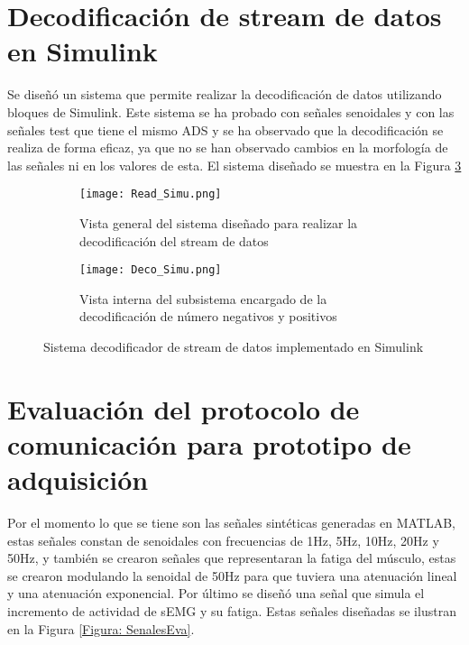 
\section{Decodificación de stream de datos en Simulink}
Se diseñó un sistema que permite realizar la decodificación de datos utilizando bloques de Simulink. Este sistema se ha probado con señales senoidales y con las señales test que tiene el mismo ADS y se ha observado que la decodificación se realiza de forma eficaz, ya que no se han observado cambios en la morfología de las señales ni en los valores de esta. El sistema diseñado se muestra en la Figura \ref{Figura: Decodi}

\begin{figure}[htbp]
	\centering
	\begin{subfigure}[htbp]{0.7\textwidth}
		\texttt{[image: Read\_Simu.png]}
		\caption{Vista general del sistema diseñado para realizar la decodificación del stream de datos}
		\label{Figura: readSimu}
	\end{subfigure}
	\begin{subfigure}[htbp]{0.7\textwidth}
		\texttt{[image: Deco\_Simu.png]}
		\caption{Vista interna del subsistema encargado de la decodificación de número negativos y positivos}
		\label{Figura: decoSimu}
	\end{subfigure}
	\caption{Sistema decodificador de stream de datos implementado en Simulink}
	\label{Figura: Decodi}
\end{figure}

\section{Evaluación del protocolo de comunicación para prototipo de adquisición}
Por el momento lo que se tiene son las señales sintéticas generadas en MATLAB, estas señales constan de senoidales con frecuencias de 1Hz, 5Hz, 10Hz, 20Hz y 50Hz, y también se crearon señales que representaran la fatiga del músculo, estas se crearon modulando la senoidal de 50Hz para que tuviera una atenuación lineal y una atenuación exponencial. Por último se diseñó una señal que simula el incremento de actividad de sEMG y su fatiga. Estas señales diseñadas se ilustran en la Figura \ref{Figura: SenalesEva}.

